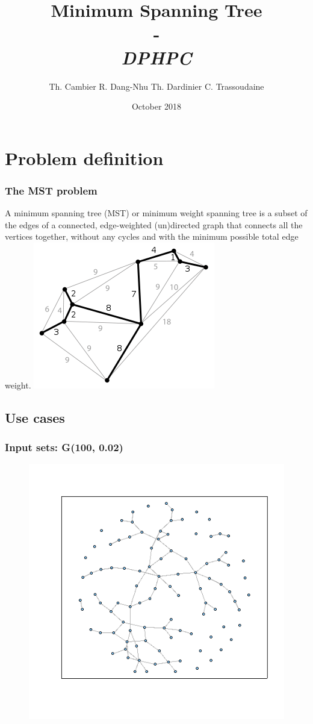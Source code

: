 \documentclass{beamer}
\institute[ETH Zürich]{\textbf{ETH Zürich}}
\date{October 2018}
\author{
    Th. Cambier
    R. Dang-Nhu
    Th. Dardinier
    C. Trassoudaine
}
\title{
	\textbf{Minimum Spanning Tree}\\
	-\\ 
	\textit{DPHPC}
}
\begin{document}

\frame{\titlepage}
\frame{\tableofcontents}



\section{Problem definition}
\begin{frame}
\frametitle{The MST problem}
 A minimum spanning tree (MST) or minimum weight spanning tree is a subset of the edges of a connected, edge-weighted (un)directed graph that connects all the vertices together, without any cycles and with the minimum possible total edge weight. 
 \includegraphics[width=.5\textwidth]{MST.png}
\end{frame}
\subsection{Use cases}

\begin{frame}
\frametitle{Input sets: G(100, 0.02)}
\begin{figure}
 \includegraphics[width=.7\textwidth]{graphGNP.png}
\end{figure}
\end{frame}
\end{document}

